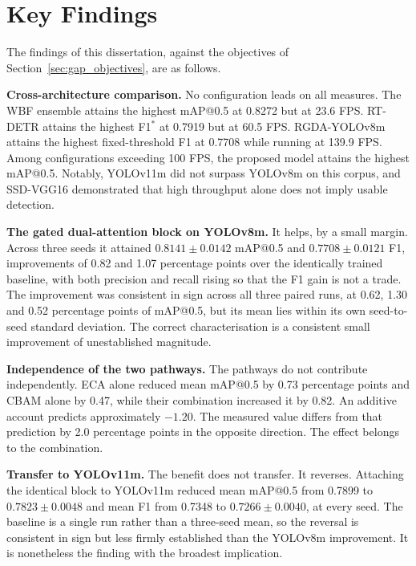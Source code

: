 \documentclass[MScCS]{uccthesis}
\begin{document}
\section{Key Findings}
\label{sec:conc_findings}

The findings of this dissertation, against the objectives of
Section~\ref{sec:gap_objectives}, are as follows.

\textbf{Cross-architecture comparison.} No configuration leads on all
measures. The WBF ensemble attains the highest mAP@0.5 at 0.8272 but at 23.6
FPS. RT-DETR attains the highest F1$^{\ast}$ at 0.7919 but at 60.5 FPS.
RGDA-YOLOv8m attains the highest fixed-threshold F1 at 0.7708 while running at
139.9 FPS. Among configurations exceeding 100 FPS, the proposed model attains
the highest mAP@0.5. Notably, YOLOv11m did not surpass YOLOv8m on this corpus,
and SSD-VGG16 demonstrated that high throughput alone does not imply usable
detection.

\textbf{The gated dual-attention block on YOLOv8m.} It helps, by a small
margin. Across three seeds it attained $0.8141 \pm 0.0142$ mAP@0.5 and
$0.7708 \pm 0.0121$ F1, improvements of 0.82 and 1.07 percentage points over
the identically trained baseline, with both precision and recall rising so that
the F1 gain is not a trade. The improvement was consistent in sign across all
three paired runs, at 0.62, 1.30 and 0.52 percentage points of mAP@0.5, but its
mean lies within its own seed-to-seed standard deviation. The correct
characterisation is a consistent small improvement of unestablished magnitude.

\textbf{Independence of the two pathways.} The pathways do not contribute
independently. ECA alone reduced mean mAP@0.5 by 0.73 percentage points and CBAM alone by 0.47, while
their combination increased it by 0.82. An additive account predicts
approximately $-1.20$. The measured value differs from that prediction by 2.0
percentage points in the opposite direction. The effect belongs to the
combination.

\textbf{Transfer to YOLOv11m.} The benefit does not transfer. It reverses.
Attaching the identical block to YOLOv11m reduced mean mAP@0.5 from 0.7899 to
$0.7823 \pm 0.0048$ and mean F1 from 0.7348 to $0.7266 \pm 0.0040$, at every
seed. The baseline is a single run rather than a three-seed mean, so the
reversal is consistent in sign but less firmly established than the YOLOv8m
improvement. It is nonetheless the finding with the broadest implication.
\end{document}
